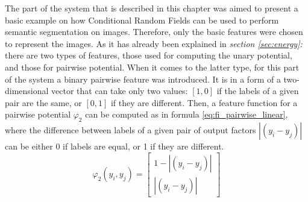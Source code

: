 The part of the system that is described in this chapter was aimed to present a basic example on how Conditional Random Fields can be used to perform semantic segmentation on images. Therefore, only the basic features were chosen to represent the images. As it has already been explained in \textit{section \ref{sec:energy}: } there are two types of features, those used for computing the unary potential, and those for pairwise potential. When it comes to the latter type, for this part of the system a binary pairwise feature was introduced. It is in a form of a two-dimensional vector that can take only two values: $[1,0]$ if the labels of a given pair are the same, or $[0,1]$ if they are different. Then, a feature function for a pairwise potential $\varphi_2$ can be computed as in formula \ref{eq:fi_pairwise_linear}, where the difference between labels of a given pair of output factors $\left | (y_i - y_j) \right |$ can be either 0 if labels are equal, or 1 if they are different. 
\begin{equation}
    \label{eq:fi_pairwise_linear}
        \varphi_2(y_i,y_j) = \begin{bmatrix}
        1 - \left | (y_i - y_j) \right | \\
        \left | (y_i - y_j) \right |
    \end{bmatrix}
\end{equation}

